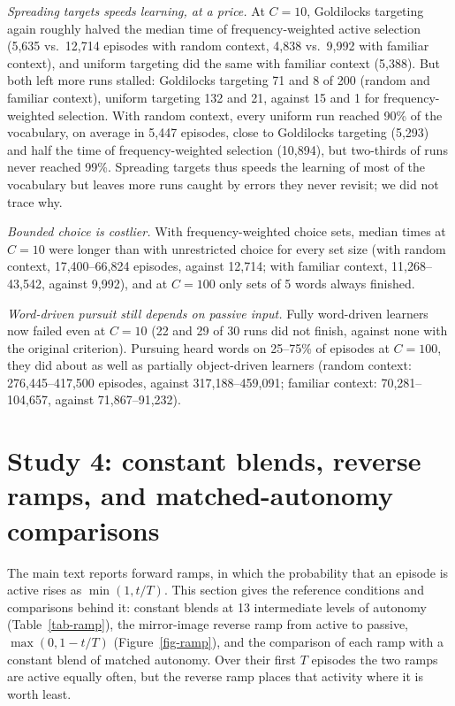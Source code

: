 \documentclass[11pt]{article}
\begin{document}
\textit{Spreading targets speeds learning, at a price.} At $C=10$, Goldilocks targeting again roughly halved the median time of frequency-weighted active selection (5,635 vs.\ 12,714 episodes with random context, 4,838 vs.\ 9,992 with familiar context), and uniform targeting did the same with familiar context (5,388). But both left more runs stalled: Goldilocks targeting 71 and 8 of 200 (random and familiar context), uniform targeting 132 and 21, against 15 and 1 for frequency-weighted selection. With random context, every uniform run reached 90\% of the vocabulary, on average in 5,447 episodes, close to Goldilocks targeting (5,293) and half the time of frequency-weighted selection (10,894), but two-thirds of runs never reached 99\%. Spreading targets thus speeds the learning of most of the vocabulary but leaves more runs caught by errors they never revisit; we did not trace why.

\textit{Bounded choice is costlier.} With frequency-weighted choice sets, median times at $C=10$ were longer than with unrestricted choice for every set size (with random context, 17,400--66,824 episodes, against 12,714; with familiar context, 11,268--43,542, against 9,992), and at $C=100$ only sets of 5 words always finished.

\textit{Word-driven pursuit still depends on passive input.} Fully word-driven learners now failed even at $C=10$ (22 and 29 of 30 runs did not finish, against none with the original criterion). Pursuing heard words on 25--75\% of episodes at $C=100$, they did about as well as partially object-driven learners (random context: 276,445--417,500 episodes, against 317,188--459,091; familiar context: 70,281--104,657, against 71,867--91,232).

\section{Study 4: constant blends, reverse ramps, and matched-autonomy comparisons}
\label{sec-ramp-details}
\label{sec-lock-ramp}
The main text reports forward ramps, in which the probability that an episode is active rises as $\min(1, t/T)$. This section gives the reference conditions and comparisons behind it: constant blends at 13 intermediate levels of autonomy (Table~\ref{tab-ramp}), the mirror-image reverse ramp from active to passive, $\max(0, 1-t/T)$ (Figure~\ref{fig-ramp}), and the comparison of each ramp with a constant blend of matched autonomy. Over their first $T$ episodes the two ramps are active equally often, but the reverse ramp places that activity where it is worth least.
\end{document}
